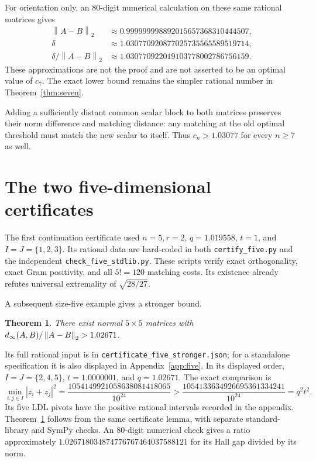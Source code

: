 \documentclass[11pt,letterpaper]{article}
\newtheorem{theorem}{Theorem}[section]\newtheorem{lemma}[theorem]{Lemma}\newtheorem{proposition}[theorem]{Proposition}\newtheorem{corollary}[theorem]{Corollary}
\theoremstyle{remark}\newtheorem{remark}[theorem]{Remark}
\newcommand{\norm}[1]{\left\lVert#1\right\rVert_2}\newcommand{\abs}[1]{\left|#1\right|}\newcommand{\diag}{\operatorname{diag}}\newcommand{\rank}{\operatorname{rank}}
\begin{document}
For orientation only, an 80-digit numerical calculation on these same rational matrices gives
\begin{align*}
\norm{A-B}&\approx0.999999998892015657368310444507,\\
\delta&\approx1.030770920877025735565589519714,\\
\delta/\norm{A-B}&\approx1.030770922019103778002786756159.
\end{align*}
These approximations are not the proof and are not asserted to be an optimal value of $c_7$. The exact lower bound remains the simpler rational number in Theorem~\ref{thm:seven}.

Adding a sufficiently distant common scalar block to both matrices preserves their norm difference and matching distance: any matching at the old optimal threshold must match the new scalar to itself. Thus $c_n>1.03077$ for every $n\ge7$ as well.

\section{The two five-dimensional certificates}\label{sec:five}
The first continuation certificate used $n=5,r=2$, $q=1.019558$, $t=1$, and $I=J=\{1,2,3\}$. Its rational data are hard-coded in both \texttt{certify\_five.py} and the independent \texttt{check\_five\_stdlib.py}. These scripts verify exact orthogonality, exact Gram positivity, and all $5!=120$ matching costs. Its existence already refutes universal extremality of $\sqrt{28/27}$.

A subsequent size-five example gives a stronger bound.
\begin{theorem}\label{thm:five}
There exist normal $5\times5$ matrices with $\din(A,B)/\norm{A-B}>1.02671$.
\end{theorem}
Its full rational input is in \texttt{certificate\_five\_stronger.json}; for a standalone specification it is also displayed in Appendix~\ref{app:five}. In its displayed order, $I=J=\{2,4,5\}$, $t=1.0000001$, and $q=1.02671$. The exact comparison is
\[
\min_{i,j\in I}|z_i+z_j|^2
=\frac{1054149921058638081418065}{10^{24}}
>\frac{1054133634926695361334241}{10^{24}}=q^2t^2.
\]
Its five LDL pivots have the positive rational intervals recorded in the appendix. Theorem~\ref{thm:five} follows from the same certificate lemma, with separate standard-library and SymPy checks. An 80-digit numerical check gives a ratio approximately $1.026718034874776767464037588121$ for its Hall gap divided by its norm.
\end{document}
